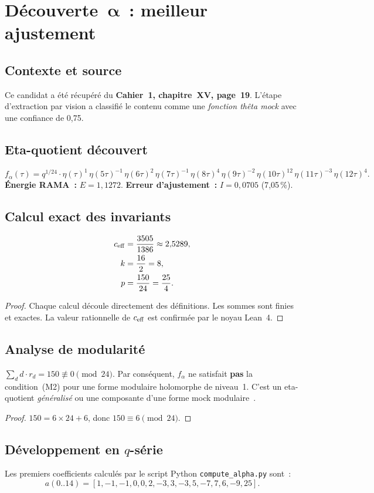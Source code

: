\section{Découverte~$\boldsymbol{\alpha}$~: meilleur ajustement}
\label{sec:alpha}

\subsection{Contexte et source}
Ce candidat a été récupéré du \textbf{Cahier~1, chapitre~XV, page~19}. L'étape d'extraction par vision a classifié le contenu comme une \emph{fonction thêta mock} avec une confiance de 0,75.

\subsection{Eta-quotient découvert}
\begin{equation}
  f_\alpha(\tau) = q^{1/24} \cdot \eta(\tau)^{1} \, \eta(5\tau)^{-1} \, \eta(6\tau)^{2} \, \eta(7\tau)^{-1} \, \eta(8\tau)^{4} \, \eta(9\tau)^{-2} \, \eta(10\tau)^{12} \, \eta(11\tau)^{-3} \, \eta(12\tau)^{4}.
\end{equation}
\textbf{Énergie RAMA~:} $E = 1{,}1272$. \quad \textbf{Erreur d'ajustement~:} $I = 0{,}0705$ (7{,}05\,\%).

\subsection{Calcul exact des invariants}
\begin{proposition}
\begin{align}
  c_{\mathrm{eff}} &= \frac{3505}{1386} \approx 2{,}5289, \\
  k &= \frac{16}{2} = 8, \\
  p &= \frac{150}{24} = \frac{25}{4}.
\end{align}
\end{proposition}

\begin{proof}
Chaque calcul découle directement des définitions. Les sommes sont finies et exactes. La valeur rationnelle de $c_{\mathrm{eff}}$ est confirmée par le noyau Lean~4.
\end{proof}

\subsection{Analyse de modularité}
\begin{proposition}
$\sum_d d \cdot r_d = 150 \not\equiv 0 \pmod{24}$. Par conséquent, $f_\alpha$ ne satisfait \textbf{pas} la condition~(M2) pour une forme modulaire holomorphe de niveau~1. C'est un eta-quotient \emph{généralisé} ou une composante d'une forme mock modulaire~\cite{zwegers2002,bringmann_ono_2006}.
\end{proposition}

\begin{proof}
$150 = 6 \times 24 + 6$, donc $150 \equiv 6 \pmod{24}$.
\end{proof}

\subsection{Développement en $q$-série}
Les premiers coefficients calculés par le script Python \texttt{compute\_alpha.py} sont~:
\[
  a(0..14) = [1, -1, -1, 0, 0, 2, -3, 3, -3, 5, -7, 7, 6, -9, 25].
\]
